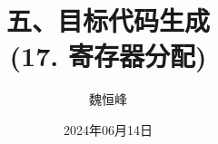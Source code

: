 \documentclass[]{beamer}
\title[目标代码生成]{五、目标代码生成 \\ (17. 寄存器分配)}
\author[魏恒峰]{\large 魏恒峰}
\institute{hfwei@nju.edu.cn}
\date{2024年06月14日}
\begin{document}
\maketitle



\thankyou{}

\end{document}
